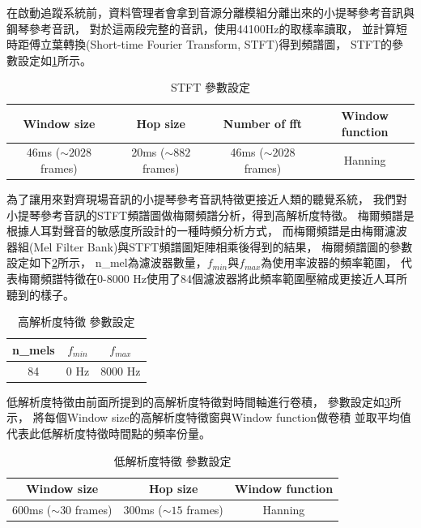 \documentclass[class=NCU_thesis, crop=false]{standalone}
\begin{document}
在啟動追蹤系統前，資料管理者會拿到音源分離模組分離出來的小提琴參考音訊與鋼琴參考音訊，
對於這兩段完整的音訊，使用44100Hz的取樣率讀取，
並計算短時距傅立葉轉換(Short-time Fourier Transform, STFT)得到頻譜圖，
STFT的參數設定如\cref{table:table-stft-parameter-setting}所示。

\begin{table}[h]
    \centering
    \caption{STFT 參數設定}
    \label{table:table-stft-parameter-setting}
    \begin{tabular}{|c|c|c|c|}
        \hline
        \multicolumn{1}{|c|}{Window size} & \multicolumn{1}{|c|}{Hop size} & \multicolumn{1}{|c|}{Number of fft} & \multicolumn{1}{|c|}{Window function}\\
        \hline
        46ms ($\sim 2028$ frames) & 20ms ($\sim 882$ frames) & 46ms ($\sim 2028$ frames) & Hanning\\
        \hline
    \end{tabular}
\end{table}

為了讓用來對齊現場音訊的小提琴參考音訊特徵更接近人類的聽覺系統，
我們對小提琴參考音訊的STFT頻譜圖做梅爾頻譜分析，得到高解析度特徵。
梅爾頻譜是根據人耳對聲音的敏感度所設計的一種時頻分析方式，
而梅爾頻譜是由梅爾濾波器組(Mel Filter Bank)與STFT頻譜圖矩陣相乘後得到的結果，
梅爾頻譜圖的參數設定如下\cref{table:table-high-resolution-feature-parameter-setting}所示，
n\_mel為濾波器數量，$f_{min}$與$f_{max}$為使用率波器的頻率範圍，
代表梅爾頻譜特徵在0-8000 Hz使用了84個濾波器將此頻率範圍壓縮成更接近人耳所聽到的樣子。

\begin{table}[h]
    \centering
    \caption{高解析度特徵 參數設定}
    \label{table:table-high-resolution-feature-parameter-setting}
    \begin{tabular}{|c|c|c|}
        \hline
        \multicolumn{1}{|c|}{n\_mels} & \multicolumn{1}{|c|}{$f_{min}$} & \multicolumn{1}{|c|}{$f_{max}$}\\
        \hline
        84 & 0 Hz & 8000 Hz\\
        \hline
    \end{tabular}
\end{table}

低解析度特徵由前面所提到的高解析度特徵對時間軸進行卷積，
參數設定如\cref{table:table-low-resolution-feature-parameter-setting}所示，
將每個Window size的高解析度特徵窗與Window function做卷積
並取平均值代表此低解析度特徵時間點的頻率份量。

\begin{table}[h]
    \centering
    \caption{低解析度特徵 參數設定}
    \label{table:table-low-resolution-feature-parameter-setting}
    \begin{tabular}{|c|c|c|}
        \hline
        \multicolumn{1}{|c|}{Window size} & \multicolumn{1}{|c|}{Hop size} & \multicolumn{1}{|c|}{Window function}\\
        \hline
        600ms ($\sim 30$ frames) & 300ms ($\sim 15$ frames) & Hanning \\
        \hline
    \end{tabular}
\end{table}
\end{document}
